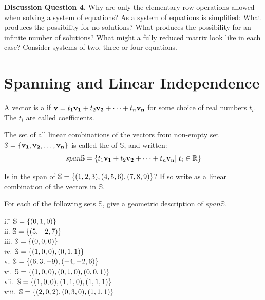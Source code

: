   \noindent \textbf{Discussion Question 4.} Why are only the elementary row operations allowed when solving a system of equations? As a system of equations is simplified: What produces the possibility for no solutions?  What produces the possibility for an infinite number of solutions? What might a fully reduced matrix look like in each case? Consider systems of two, three or four equations. 

\section{Spanning and Linear Independence}      \label{Spanning and Linear Independence}  
 
 \begin{defn}
 	A vector  is a  if $\mathbf{v} = t_1\mathbf{v_1}+t_2\mathbf{v_2} + \cdots + t_n\mathbf{v_n}$ for some choice of real numbers $t_i$. The $t_i$ are called coefficients.
 \end{defn}
 
 \begin{defn}
 	The set of all linear combinations of the vectors from non-empty set $\mathbb{S} = \{\mathbf{v_1}, \mathbf{v_2}, \ldots, \mathbf{v_n} \}$ is called the   of $\mathbb{S}$, and written: \[span\mathbb{S} = \{ t_1\mathbf{v_1}+t_2\mathbf{v_2}+\cdots+t_n\mathbf{v_n} | \; t_i \in \mathbb{R} \}\]  
 \end{defn}
 
 \begin{myexa}[\bd{a}]
 	 Is  in the span of $\mathbb{S}=\{({1},{2},{3}), ({4},{5},{6}), ({7},{8},{9}) \} $? If so write  as a linear combination of the vectors in $\mathbb{S}$. 
 \end{myexa}
 
 \begin{myexb}[\bd{b}]
 	 For each of the following sets $\mathbb{S}$, give a geometric description of $span\mathbb{S}$. 
 	 \begin{tabbing}
 	 \indent i. \quad  \= $ \mathbb{S}=\{ ({0},{1},{0}) \} $\\
 	 \indent ii. \> $ \mathbb{S}=\{({5},{-2},{7}) \}$\\
 	 \indent iii.\> $ \mathbb{S}=\{({0},{0},{0}) \}$ \\
 	 \indent iv. \> $ \mathbb{S}=\{({1},{0},{0}),({0},{1},{1})\}$\\
 	 \indent v.  \> $ \mathbb{S}=\{({6},{3},{-9}),({-4},{-2},{6})\}$\\
 	 \indent vi. \>   $\mathbb{S}	   		  	   =\{({1},{0},{0}),({0},{1},{0}),({0},{0},{1})\}$\\
 	 \indent vii.\> $ \mathbb{S} =\{({1},{0},{0}),({1},{1},{0}),({1},{1},{1})\}$\\
 	  \indent viii.\> $ \mathbb{S} =\{({2},{0},{2}),({0},{3},{0}),({1},{1},{1})\}$\\
 	 \end{tabbing}
 \end{myexb}
 
